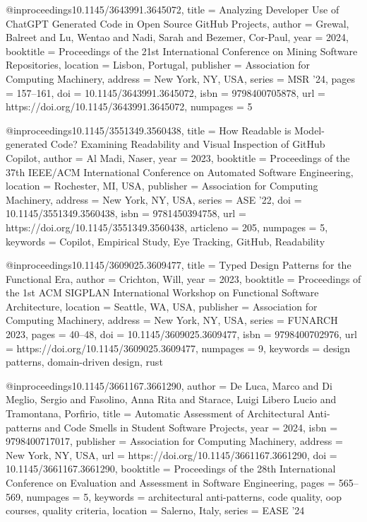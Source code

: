 @inproceedings{10.1145/3643991.3645072,
title = {Analyzing Developer Use of ChatGPT Generated Code in Open Source GitHub Projects},
author = {Grewal, Balreet and Lu, Wentao and Nadi, Sarah and Bezemer, Cor-Paul},
year = 2024,
booktitle = {Proceedings of the 21st International Conference on Mining Software Repositories},
location = {Lisbon, Portugal},
publisher = {Association for Computing Machinery},
address = {New York, NY, USA},
series = {MSR '24},
pages = {157–161},
doi = {10.1145/3643991.3645072},
isbn = 9798400705878,
url = {https://doi.org/10.1145/3643991.3645072},
numpages = 5
}

%
@inproceedings{10.1145/3551349.3560438,
title = {How Readable is Model-generated Code? Examining Readability and Visual Inspection of GitHub Copilot},
author = {Al Madi, Naser},
year = 2023,
booktitle = {Proceedings of the 37th IEEE/ACM International Conference on Automated Software Engineering},
location = {Rochester, MI, USA},
publisher = {Association for Computing Machinery},
address = {New York, NY, USA},
series = {ASE '22},
doi = {10.1145/3551349.3560438},
isbn = 9781450394758,
url = {https://doi.org/10.1145/3551349.3560438},
articleno = 205,
numpages = 5,
keywords = {Copilot, Empirical Study, Eye Tracking, GitHub, Readability}
}

@inproceedings{10.1145/3609025.3609477,
title = {Typed Design Patterns for the Functional Era},
author = {Crichton, Will},
year = 2023,
booktitle = {Proceedings of the 1st ACM SIGPLAN International Workshop on Functional Software Architecture},
location = {Seattle, WA, USA},
publisher = {Association for Computing Machinery},
address = {New York, NY, USA},
series = {FUNARCH 2023},
pages = {40–48},
doi = {10.1145/3609025.3609477},
isbn = 9798400702976,
url = {https://doi.org/10.1145/3609025.3609477},
numpages = 9,
keywords = {design patterns, domain-driven design, rust}
}

@inproceedings{10.1145/3661167.3661290,
author = {De Luca, Marco and Di Meglio, Sergio and Fasolino, Anna Rita and Starace, Luigi Libero Lucio and Tramontana, Porfirio},
title = {Automatic Assessment of Architectural Anti-patterns and Code Smells in Student Software Projects},
year = {2024},
isbn = {9798400717017},
publisher = {Association for Computing Machinery},
address = {New York, NY, USA},
url = {https://doi.org/10.1145/3661167.3661290},
doi = {10.1145/3661167.3661290},
booktitle = {Proceedings of the 28th International Conference on Evaluation and Assessment in Software Engineering},
pages = {565–569},
numpages = {5},
keywords = {architectural anti-patterns, code quality, oop courses, quality criteria},
location = {Salerno, Italy},
series = {EASE '24}
}

